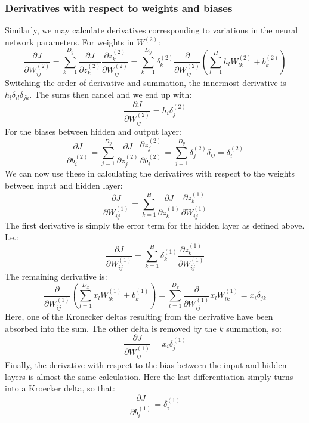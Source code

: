 \documentclass[12pt, a4paper]{article}
\numberwithin{equation}{section}
\begin{document}
\subsubsection{Derivatives with respect to weights and biases}
Similarly, we may calculate derivatives corresponding to variations in the neural network parameters. For weights in $W^{(2)}$:
\begin{equation}
\frac{\partial J}{\partial W^{(2)}_{ij}}=\sum_{k=1}^{D_y}\frac{\partial J}{\partial z^{(2)}_k}\frac{\partial z^{(2)}_k}{\partial W^{(2)}_{ij}}=\sum_{k=1}^{D_y}\delta^{(2)}_k\frac{\partial}{\partial W^{(2)}_{ij}}\left(\sum_{l=1}^H h_l W^{(2)}_{lk}+b^{(2)}_k\right)
\end{equation}
Switching the order of derivative and summation, the innermost derivative is $h_l\delta_{il}\delta_{jk}$. The sums then cancel and we end up with:
\begin{equation}
\frac{\partial J}{\partial W^{(2)}_{ij}}=h_i\delta^{(2)}_j
\end{equation}
For the biases between hidden and output layer:
\begin{equation}
\frac{\partial J}{\partial b^{(2)}_i}=\sum_{j=1}^{D_y}\frac{\partial J}{\partial z^{(2)}_j}\frac{\partial z^{(2)}_j}{\partial b^{(2)}_i}=\sum_{j=1}^{D_y}\delta^{(2)}_j\delta_{ij}=\delta^{(2)}_i
\end{equation}
We can now use these in calculating the derivatives with respect to the weights between input and hidden layer:
\begin{equation}
\frac{\partial J}{\partial W^{(1)}_{ij}}=\sum_{k=1}^H\frac{\partial J}{\partial z^{(1)}_k}\frac{\partial z^{(1)}_k}{\partial W^{(1)}_{ij}}
\end{equation}
The first derivative is simply the error term for the hidden layer as defined above. I.e.:
\begin{equation}
\frac{\partial J}{\partial W^{(1)}_{ij}}=\sum_{k=1}^H\delta^{(1)}_k\frac{\partial z^{(1)}_k}{\partial W^{(1)}_{ij}}
\end{equation}
The remaining derivative is:
\begin{equation}
\frac{\partial}{\partial W^{(1)}_{ij}}\left(\sum_{l=1}^{D_x}x_l W^{(1)}_{lk}+b^{(1)}_k\right)=\sum_{l=1}^{D_x}\frac{\partial}{\partial W^{(1)}_{ij}}x_l W^{(1)}_{lk}=x_i\delta_{jk}
\end{equation}
Here, one of the Kronecker deltas resulting from the derivative have been absorbed into the sum. The other delta is removed by the $k$ summation, so:
\begin{equation}
\frac{\partial J}{\partial W^{(1)}_{ij}}=x_i\delta^{(1)}_j
\end{equation}
Finally, the derivative with respect to the bias between the input and hidden layers is almost the same calculation. Here the last differentiation simply turns into a Kroecker delta, so that:
\begin{equation}
\frac{\partial J}{\partial b^{(1)}_i}=\delta^{(1)}_i
\end{equation}
\end{document}
